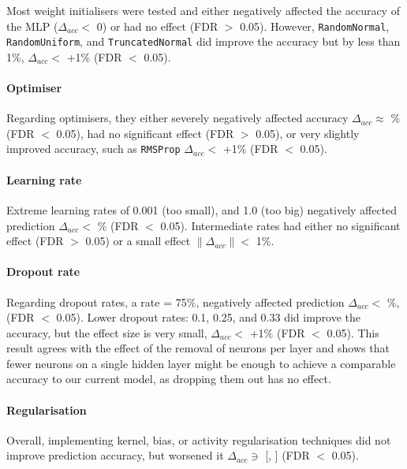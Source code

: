 Most weight initialisers were tested and either negatively affected the accuracy of the MLP ($\Delta_{acc} <$ 0) or had no effect (FDR $>$ 0.05). However, \texttt{RandomNormal}, \texttt{RandomUniform}, and \texttt{TruncatedNormal} did improve the accuracy but by less than 1\%, $\Delta_{acc} <$ +1\% (FDR $<$ 0.05).

\paragraph{Optimiser}

Regarding optimisers, they either severely negatively affected accuracy $\Delta_{acc} \approx$ \% (FDR $<$ 0.05), had no significant effect (FDR $>$ 0.05), or very slightly improved accuracy, such as \texttt{RMSProp} $\Delta_{acc} <$ +1\% (FDR $<$ 0.05).

\paragraph{Learning rate}

Extreme learning rates of 0.001 (too small), and 1.0 (too big) negatively affected prediction $\Delta_{acc} <$ \% (FDR $<$ 0.05). Intermediate rates had either no significant effect (FDR $>$ 0.05) or a small effect $\|\Delta_{acc}\| <$ 1\%.

\paragraph{Dropout rate}

Regarding dropout rates, a rate = 75\%, negatively affected prediction  $\Delta_{acc} <$ \%,(FDR $<$ 0.05). Lower dropout rates: 0.1, 0.25, and 0.33 did improve the accuracy, but the effect size is very small, $\Delta_{acc} <$ +1\% (FDR $<$ 0.05). This result agrees with the effect of the removal of neurons per layer and shows that fewer neurons on a single hidden layer might be enough to achieve a comparable accuracy to our current model, as dropping them out has no effect.

\paragraph{Regularisation}

Overall, implementing kernel, bias, or activity regularisation techniques did not improve prediction accuracy, but worsened it $\Delta_{acc} \ni$ [, ] (FDR $<$ 0.05).

